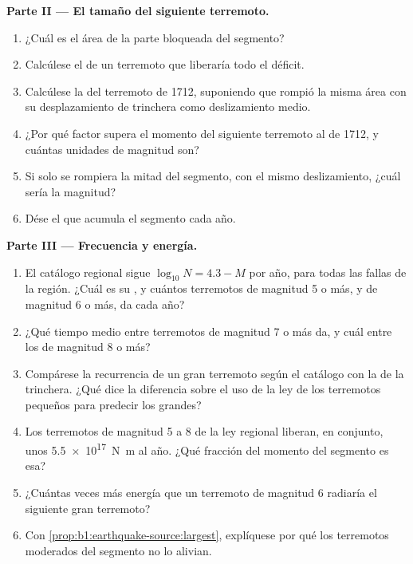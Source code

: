 \begin{problem}
\medskip
\noindent\textbf{Parte II --- El tamaño del siguiente terremoto.}
\begin{enumerate}[resume]
  \item ¿Cuál es el área de la parte bloqueada del segmento?
  \item Calcúlese el  de un terremoto que liberaría todo el déficit.
  \item Calcúlese la  del terremoto de 1712, suponiendo que rompió la misma área con su desplazamiento de trinchera como
        deslizamiento medio.
  \item ¿Por qué factor supera el momento del siguiente terremoto al de 1712, y cuántas unidades de magnitud son?
  \item Si solo se rompiera la mitad del segmento, con el mismo deslizamiento, ¿cuál sería la magnitud?
  \item Dése el  que acumula el segmento cada año.
\end{enumerate}

\medskip
\noindent\textbf{Parte III --- Frecuencia y energía.}
\begin{enumerate}[resume]
  \item El catálogo regional sigue $\log_{10} N = 4.3 - M$ por año, para todas las fallas de la región. ¿Cuál es su , y cuántos
        terremotos de magnitud 5 o más, y de magnitud 6 o más, da cada año?
  \item ¿Qué tiempo medio entre terremotos de magnitud 7 o más da, y cuál entre los de magnitud 8 o más?
  \item Compárese la recurrencia de un gran terremoto según el catálogo con la de la trinchera. ¿Qué dice la diferencia sobre el uso de
        la ley de los terremotos pequeños para predecir los grandes?
  \item Los terremotos de magnitud 5 a 8 de la ley regional liberan, en conjunto, unos \qty{5.5e17}{N.m} al año. ¿Qué fracción del momento
        del segmento es esa?
  \item ¿Cuántas veces más energía que un terremoto de magnitud 6 radiaría el siguiente gran terremoto?
  \item Con \cref{prop:b1:earthquake-source:largest}, explíquese por qué los terremotos moderados del segmento no lo alivian.
\end{enumerate}


\end{problem}
